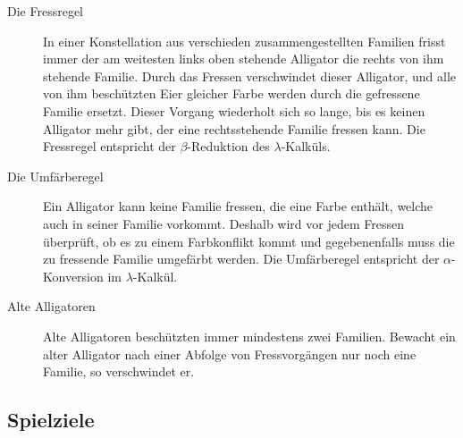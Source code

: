 	\begin{description}

		\item[Die Fressregel] In einer Konstellation aus verschieden zusammengestellten Familien frisst immer der am weitesten links oben stehende Alligator die rechts von ihm stehende Familie.
		Durch das Fressen verschwindet dieser Alligator, und alle von ihm beschützten Eier gleicher Farbe werden durch die gefressene Familie ersetzt.
		Dieser Vorgang wiederholt sich so lange, bis es keinen Alligator mehr gibt, der eine rechtsstehende Familie fressen kann.
		Die Fressregel entspricht der \(\beta\)-Reduktion des \(\lambda\)-Kalküls.

		\item[Die Umfärberegel] Ein Alligator kann keine Familie fressen, die eine Farbe enthält, welche auch in seiner Familie vorkommt.
		Deshalb wird vor jedem Fressen überprüft, ob es zu einem Farbkonflikt kommt und gegebenenfalls muss die zu fressende Familie umgefärbt werden.
		Die Umfärberegel entspricht der \(\alpha\)-Konversion im \(\lambda\)-Kalkül.

		\item[Alte Alligatoren] Alte Alligatoren beschützten immer mindestens zwei Familien.
		Bewacht ein alter Alligator nach einer Abfolge von Fressvorgängen nur noch eine Familie, so verschwindet er.

	\end{description}

\subsection{Spielziele}

